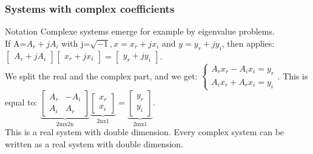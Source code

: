 \begin{frame}
	\frametitle{Systems with complex coefficients}
	\begin{block}{Notation}
		Complexe systems emerge for example by eigenvalue problems.\\
		If A=$A_r+jA_i$ with j=$\sqrt{-1}, x=x_r+jx_i$ and $y=y_r+jy_i$, then applies: $\begin{bmatrix}
			A_r+jA_i
		\end{bmatrix}\begin{bmatrix}
		x_r+jx_i
		\end{bmatrix}=\begin{bmatrix}
		y_r+jy_i
		\end{bmatrix}$. \\
		We split the real and the complex part, and we get: $\begin{cases}
		A_rx_r-A_ix_i=y_r\\
		A_ix_r+A_rx_i=y_i
		\end{cases}$. This is equal to: $\underbrace{\begin{bmatrix}
		A_r & -A_i\\
		A_i & A_r
		\end{bmatrix}}_\text{2mx2n}\underbrace{\begin{bmatrix}
		x_r\\x_i
		\end{bmatrix}}_\text{2nx1}=\underbrace{\begin{bmatrix}
		y_r\\y_i
		\end{bmatrix}}_\text{2mx1}$.\\
	This is a real system with double dimension. Every complex system can be written as a real system with double dimension.
	\end{block}
\end{frame}

